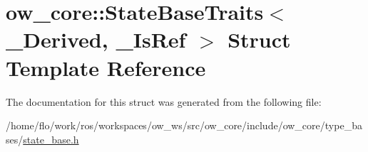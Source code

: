 \hypertarget{structow__core_1_1StateBaseTraits}{}\section{ow\+\_\+core\+:\+:State\+Base\+Traits$<$ \+\_\+\+Derived, \+\_\+\+Is\+Ref $>$ Struct Template Reference}
\label{structow__core_1_1StateBaseTraits}


The documentation for this struct was generated from the following file\+:\begin{DoxyCompactItemize}
\item 
/home/flo/work/ros/workspaces/ow\+\_\+ws/src/ow\+\_\+core/include/ow\+\_\+core/type\+\_\+bases/\hyperlink{state__base_8h}{state\+\_\+base.\+h}\end{DoxyCompactItemize}
